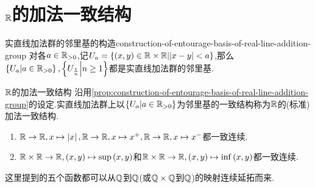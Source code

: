 \section{\texorpdfstring{$\mathbb{R}$}{R}的加法一致结构}

\begin{proposition}{实直线加法群的邻里基的构造}{construction-of-entourage-basis-of-real-line-addition-group}
	对各$a\in\mathbb{R}_{>0}$,记$U_{a}=\left\{\left(x,y\right)\in\mathbb{R}\times\mathbb{R}\middle|\left|x-y\right|<a\right\}$,那么$\left\{U_{a}\middle|a\in\mathbb{R}_{>0}\right\},\left\{
	U_{\frac{1}{n}}\middle|n\geq 1\right\}$都是实直线加法群的邻里基.
\end{proposition}

\begin{definition}{$\mathbb{R}$的加法一致结构}{}
	沿用\cref{prop:construction-of-entourage-basis-of-real-line-addition-group}的设定.实直线加法群上以$\left\{U_{a}\middle|a\in\mathbb{R}_{>0}\right\}$为邻里基的一致结构称为$\mathbb{R}$的(标准)加法一致结构.
\end{definition}

\begin{proposition}{}{}
	\begin{enumerate}
		\item $\mathbb{R}\to\mathbb{R},x\mapsto\left|x\right|,\mathbb{R}\to\mathbb{R},x\mapsto x^{+},\mathbb{R}\to\mathbb{R},x\mapsto x^{-}$都一致连续.
		\item $\mathbb{R}\times\mathbb{R}\to\mathbb{R},\left(x,y\right)\mapsto\sup\left(x,y\right)$和$\mathbb{R}\times\mathbb{R}\to\mathbb{R},\left(x,y\right)\mapsto\inf\left(x,y\right)$都一致连续.
	\end{enumerate}
\end{proposition}

\begin{remark}{}{}
	这里提到的五个函数都可以从$\mathbb{Q}$到$\mathbb{Q}$(或$\mathbb{Q}\times\mathbb{Q}$到$\mathbb{Q}$)的映射连续延拓而来.
\end{remark}